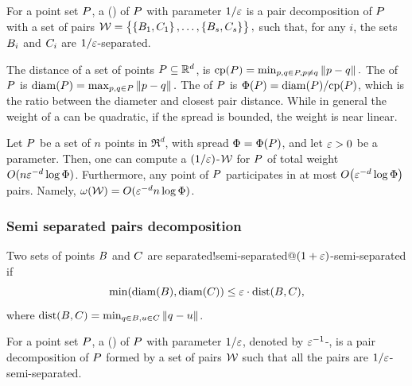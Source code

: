 \documentclass[12pt]{article}%
\begin{document}
\begin{defn}
    For a point set $P$, a  (\emphOnly{\WSPD{}}) of $P$ with parameter
    $1/\varepsilon$ is a pair decomposition of $P$ with a set of pairs
    \begin{math}
        \mathcal{W} = \left\{ {\bigl.
           \left\{ {B_1,C_1} \right\},\ldots,\left\{ {B_s,C_s} \right\}} \right\},
    \end{math}
    such that, for any $i$, the sets $B_i$ and $C_i$ are
    $1/\varepsilon$-separated.
\end{defn}


The  distance of a set of points
$P \subseteq \mathbb{R}^d$, is
\begin{math}
    \cpX{\PS} = \min_{\pa, \pb \in \PS, \pa \neq \pb} \dY{\pa}{\pb}.
\end{math}
The  of $P$ is
\begin{math}
    \diamX{\PS} = \max_{\pa, \pb \in \PS} \dY{\pa}{\pb}.
\end{math}
The  of $P$ is
$\spreadX{\PS} = \diamX{\PS} / \cpX{\PS}$, which is the ratio between
the diameter and closest pair distance.  While in general the weight
of a \WSPD can be quadratic, if the spread is bounded, the weight is
near linear.

\begin{lemma}
    Let $P$ be a set of $n$ points in $\Re^d$, with spread
    $\spread = \spreadX{\PS}$, and let $\varepsilon > 0$ be a
    parameter. Then, one can compute a $(1/\varepsilon)$-\WSPD $\mathcal{W}$ for
    $P$ of total weight $O(n \varepsilon^{-d} \log \Phi)$. Furthermore,
    any point of $P$ participates in at most
    $O\pth{ \eps^{-d} \log \spread}$ pairs. Namely,
    $\WeightX{\WS} = O( \eps^{-d} n \log \spread )$.
\end{lemma}

\subsubsection{Semi separated pairs decomposition}

\begin{defn}%
    Two sets of points $B$ and $C$ are
    {separated!semi-separated@$(1+\varepsilon)$-semi-separated} if
    \begin{equation*}
        \min \pth{ \diameterX{\PSB}, \diameterX{\PSC} } \leq \eps \cdot
        \DistSetY{\PSB}{\PSC},%
    \end{equation*}
    where
    $\DistSetY{ \PSB}{\PSC} = \min_{\pb \in \PSB, \pc \in \PSC}
    \dY{\pb}{\pc}$.

    For a point set $P$, a  (\emphOnly{\SSPD{}}) of $P$ with parameter
    $1/\varepsilon$, denoted by $\varepsilon^{-1}$-\SSPD, is a pair decomposition of
    $P$ formed by a set of pairs $\mathcal{W}$ such that all the pairs
    are $1/\varepsilon$-semi-separated.
\end{defn}
\end{document}
